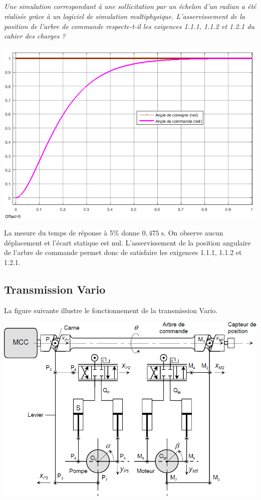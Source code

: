 \documentclass[10pt,fleqn]{article} %
\begin{document}
\begin{multicols}{2}
\begin{corrige}
\end{corrige}
\else
\fi

\subparagraph{}
\textit{Une simulation correspondant à une sollicitation par un échelon d'un radian a été réalisée grâce à un logiciel de simulation multiphysique. L'asservissement de la position de l'arbre de commande respecte-t-il les exigences 1.1.1, 1.1.2 et 1.2.1 du cahier des charges ?}
\begin{center}
\includegraphics[width=.45\textwidth]{images/simu_1}
\end{center}
\ifprof

\begin{corrige}
La mesure du temps de réponse à 5\% donne $0,475 \; \text{s}$. On observe aucun déplacement et l'écart statique est nul. L'asservissement de la position angulaire de l'arbre de commande permet donc de satisfaire les exigences 1.1.1, 1.1.2 et 1.2.1.
\end{corrige}

\else
\fi

\subsection*{Transmission Vario}
La figure suivante illustre le fonctionnement de la transmission Vario.

\begin{center}
\includegraphics[width=.49\textwidth]{images/CommandeTransmission}
\end{center}


\end{multicols}
\end{document}
